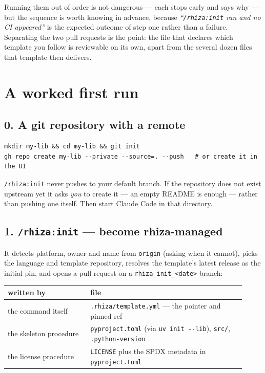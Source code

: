 \documentclass[11pt,a4paper]{article}
\newcommand{\cmd}[1]{\texttt{/rhiza:#1}}
\newcommand{\file}[1]{\texttt{#1}}
\begin{document}
\noindent
Running them out of order is not dangerous --- each stops early and says why --- but the
sequence is worth knowing in advance, because \emph{``\cmd{init} ran and no CI
appeared''} is the expected outcome of step one rather than a failure. Separating the two
pull requests is the point: the file that declares which template you follow is
reviewable on its own, apart from the several dozen files that template then delivers.

\section{A worked first run}

\subsection*{0. A git repository with a remote}

\begin{lstlisting}
mkdir my-lib && cd my-lib && git init
gh repo create my-lib --private --source=. --push   # or create it in the UI
\end{lstlisting}

\noindent
\cmd{init} never pushes to your default branch. If the repository does not exist
upstream yet it asks \emph{you} to create it --- an empty README is enough --- rather
than pushing one itself. Then start Claude Code in that directory.

\subsection*{1. \cmd{init} --- become rhiza-managed}

It detects platform, owner and name from \texttt{origin} (asking when it cannot), picks
the language and template repository, resolves the template's latest release as the
initial pin, and opens a pull request on a \texttt{rhiza\_init\_<date>} branch:

\begin{center}
\begin{tabular}{@{}p{0.32\linewidth}p{0.60\linewidth}@{}}
\toprule
\textbf{written by} & \textbf{file} \\
\midrule
the command itself & \file{.rhiza/template.yml} --- the pointer and pinned ref \\
the skeleton procedure & \file{pyproject.toml} (via \texttt{uv init -{}-lib}), \file{src/}, \file{.python-version} \\
the license procedure & \file{LICENSE} plus the SPDX metadata in \file{pyproject.toml} \\
\bottomrule
\end{tabular}
\end{center}
\end{document}
